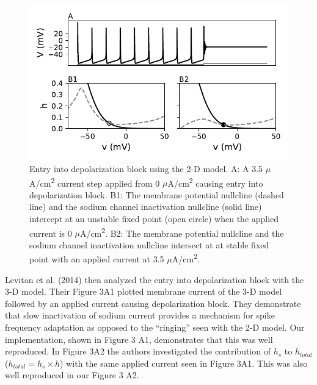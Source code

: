 \begin{figure}
	\centering
	\includegraphics[scale=0.7]{../figures/figure_2.pdf}
	\caption{Entry into depolarization block using the 2-D model. A: A 3.5 $\mu$A/cm\textsuperscript{2} current step applied from 0 $\mu$A/cm\textsuperscript{2} causing entry into depolarization block. B1: The membrane potential nullcline (dashed line) and the sodium channel inactivation nullcline (solid line) intercept at an unstable fixed point (open circle) when the applied current is 0 $\mu$A/cm\textsuperscript{2}. B2: The membrane potential nullcline and the sodium channel inactivation nullcline intersect at at stable fixed point with an applied current at 3.5 $\mu$A/cm\textsuperscript{2}.}
	\label{fig:2}
\end{figure}

Levitan et al. (2014) then analyzed the entry into depolarization block with the 3-D model. Their Figure 3A1 plotted membrane current of the 3-D model followed by an applied current causing depolarization block. They demonstrate that slow inactivation of sodium current provides a mechanism for spike frequency adaptation as opposed to the “ringing” seen with the 2-D model. Our implementation, shown in Figure 3 A1, demonstrates that this was well reproduced. In Figure 3A2 the authors investigated the contribution of $h_s$ to $h_{total}$ ($h_{total}= h_{s} \times h$) with the same applied current seen in Figure 3A1. This was also well reproduced in our Figure 3 A2. \\

